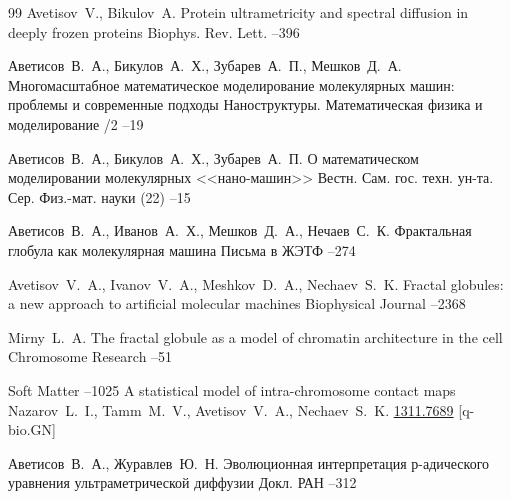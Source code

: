 \begin{thebibliography}{99}
\by Avetisov~V., Bikulov~A.
\paper Protein ultrametricity and spectral diffusion in deeply frozen proteins
\jour Biophys. Rev. Lett. 
--396

\by Аветисов~В.~А., Бикулов~А.~Х., Зубарев~А.~П., Мешков~Д.~А.
\paper Многомасштабное математическое моделирование молекулярных машин: проблемы и современные подходы
\jour Наноструктуры. Математическая физика и моделирование
/2
--19

\by Аветисов~В.~А., Бикулов~А.~Х., Зубарев~А.~П.
\paper О математическом моделировании молекулярных <<нано-машин>>
\jour Вестн. Сам. гос. техн. ун-та. Сер. Физ.-мат. науки
(22)
--15


\by Аветисов~В.~А., Иванов~А.~Х., Мешков~Д.~А., Нечаев~С.~К.
\paper Фрактальная глобула как молекулярная машина
\jour Письма в ЖЭТФ
--274

\by Avetisov~V.~A., Ivanov~V.~A., Meshkov~D.~A., Nechaev~S.~K.
\paper Fractal globules: a new approach to artificial molecular machines
\jour Biophysical Journal
--2368

\by Mirny~L.~A.
\paper The fractal globule as a model of chromatin architecture in the cell
\jour Chromosome Research
--51

\jour Soft Matter
--1025
\paper A statistical model of intra-chromosome contact maps
\by Nazarov~L.~I., Tamm~M.~V., Avetisov~V.~A., Nechaev~S.~K.
\moreref
\arxiv \href{http://arxiv.org/abs/1311.7689}{1311.7689} [q-bio.GN]


\by Аветисов~В.~А., Журавлев~Ю.~Н.
\paper Эволюционная интерпретация $р$-адического уравнения ультраметрической диффузии
\jour Докл. РАН
--312


\end{thebibliography}
